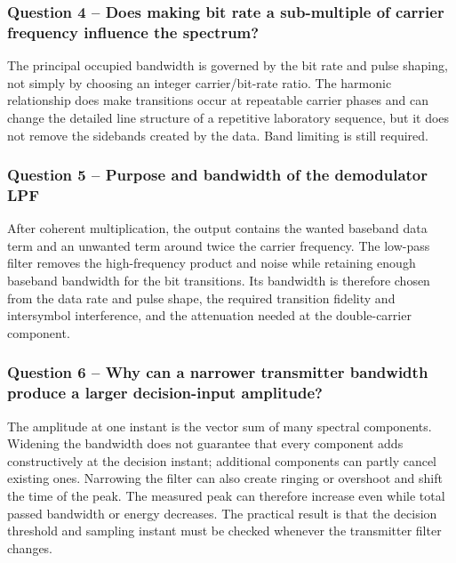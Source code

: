 \documentclass[11pt,a4paper]{article}
\begin{document}
\subsubsection*{Question 4 -- Does making bit rate a sub-multiple of carrier frequency influence the spectrum?}
\begin{answerbox}
The principal occupied bandwidth is governed by the bit rate and pulse shaping, not simply by choosing an integer carrier/bit-rate ratio. The harmonic relationship does make transitions occur at repeatable carrier phases and can change the detailed line structure of a repetitive laboratory sequence, but it does not remove the sidebands created by the data. Band limiting is still required.
\end{answerbox}

\subsubsection*{Question 5 -- Purpose and bandwidth of the demodulator LPF}
\begin{answerbox}
After coherent multiplication, the output contains the wanted baseband data term and an unwanted term around twice the carrier frequency. The low-pass filter removes the high-frequency product and noise while retaining enough baseband bandwidth for the bit transitions. Its bandwidth is therefore chosen from the data rate and pulse shape, the required transition fidelity and intersymbol interference, and the attenuation needed at the double-carrier component.
\end{answerbox}

\subsubsection*{Question 6 -- Why can a narrower transmitter bandwidth produce a larger decision-input amplitude?}
\begin{answerbox}
The amplitude at one instant is the vector sum of many spectral components. Widening the bandwidth does not guarantee that every component adds constructively at the decision instant; additional components can partly cancel existing ones. Narrowing the filter can also create ringing or overshoot and shift the time of the peak. The measured peak can therefore increase even while total passed bandwidth or energy decreases. The practical result is that the decision threshold and sampling instant must be checked whenever the transmitter filter changes.
\end{answerbox}
\end{document}
